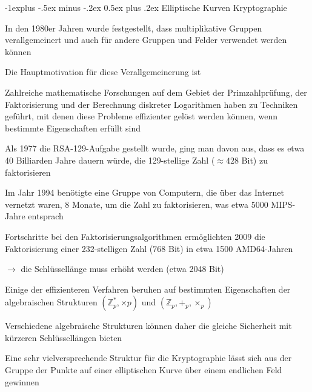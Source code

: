 \documentclass[a4paper]{article}
\makeatletter
\renewcommand{\subsection}{\@startsection{subsection}{2}{0mm}%
 {-1explus -.5ex minus -.2ex}%
 {0.5ex plus .2ex}%
 {\normalfont\normalsize\bfseries}}
\makeatother
\begin{document}
\begin{multicols}{3}
      \subsection{Elliptische Kurven Kryptographie}
      \begin{itemize*}
            \item In den 1980er Jahren wurde festgestellt, dass multiplikative Gruppen verallgemeinert und auch für andere Gruppen und Felder verwendet werden können
            \item Die Hauptmotivation für diese Verallgemeinerung ist
            \begin{itemize*}
                  \item Zahlreiche mathematische Forschungen auf dem Gebiet der Primzahlprüfung, der Faktorisierung und der Berechnung diskreter Logarithmen haben zu Techniken geführt, mit denen diese Probleme effizienter gelöst werden können, wenn bestimmte Eigenschaften erfüllt sind
                  \item Als 1977 die RSA-129-Aufgabe gestellt wurde, ging man davon aus, dass es etwa 40 Billiarden Jahre dauern würde, die 129-stellige Zahl ($\approx 428$ Bit) zu faktorisieren
                  \item Im Jahr 1994 benötigte eine Gruppe von Computern, die über das Internet vernetzt waren, 8 Monate, um die Zahl zu faktorisieren, was etwa 5000 MIPS-Jahre entsprach
                  \item Fortschritte bei den Faktorisierungsalgorithmen ermöglichten 2009 die Faktorisierung einer 232-stelligen Zahl ($768$ Bit) in etwa 1500 AMD64-Jahren
                  \item[$\rightarrow$] die Schlüssellänge muss erhöht werden (etwa 2048 Bit)
                  \item Einige der effizienteren Verfahren beruhen auf bestimmten Eigenschaften der algebraischen Strukturen $(\mathbb{Z}^*_p,\times p)$ und $(\mathbb{Z}_p, +_p, \times_p)$
                  \item Verschiedene algebraische Strukturen können daher die gleiche Sicherheit mit kürzeren Schlüssellängen bieten
            \end{itemize*}
            \item Eine sehr vielversprechende Struktur für die Kryptographie lässt sich aus der Gruppe der Punkte auf einer elliptischen Kurve über einem endlichen Feld gewinnen

\end{itemize*}
\end{multicols}
\end{document}
